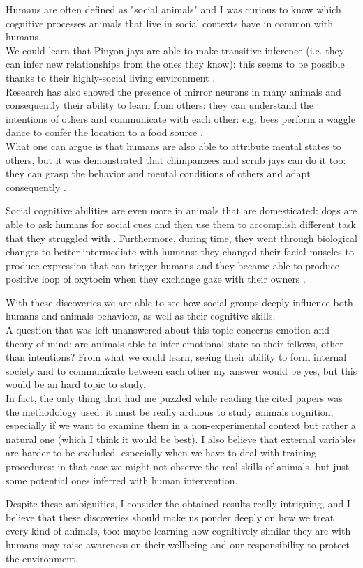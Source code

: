 Humans are often defined as "social animals" and I was curious to know which cognitive processes animals that live in social contexts have in common with humans. \\
We could learn that Pinyon jays are able to make transitive inference (i.e. they can infer new relationships from the ones they know): this seems to be possible thanks to their highly-social living environment \parencite{Bond_2003}. \\
Research has also showed the presence of mirror neurons in many animals and consequently their ability to learn from others: they can understand the intentions of others and communicate with each other: e.g. bees perform a waggle dance to confer the location to a food source \parencite{Dong_2023}. \\
What one can argue is that humans are also able to attribute mental states to others, but it was demonstrated that chimpanzees and scrub jays can do it too: they can grasp the behavior and mental conditions of others and adapt consequently \parencite{Call_2008}.

Social cognitive abilities are even more in animals that are domesticated: dogs are able to ask humans for social cues and then use them to accomplish different task that they struggled with \parencite{Here_2002}. Furthermore, during time, they went through biological changes to better intermediate with humans: they changed their facial muscles to produce expression that can trigger humans \parencite{Kaminski_2019} and they became able to produce positive loop of oxytocin when they exchange gaze with their owners \parencite{Nagasawa_2015}.

With these discoveries we are able to see how social groups deeply influence both humans and animals behaviors, as well as their cognitive skills. \\
A question that was left unanswered about this topic concerns emotion and theory of mind: are animals able to infer emotional state to their fellows, other than intentions? From what we could learn, seeing their ability to form internal society and to communicate between each other my answer would be yes, but this would be an hard topic to study. \\
In fact, the only thing that had me puzzled while reading the cited papers was the methodology used: it must be really arduous to study animals cognition, especially if we want to examine them in a non-experimental context but rather a natural one (which I think it would be best). I also believe that external variables are harder to be excluded, especially when we have to deal with training procedures: in that case we might not observe the real skills of animals, but just some potential ones inferred with human intervention.  

Despite these ambiguities, I consider the obtained results really intriguing, and I believe that these discoveries should make us ponder deeply on how we treat every kind of animals, too: maybe learning how cognitively similar they are with humans may raise awareness on their wellbeing and our responsibility to protect the environment.